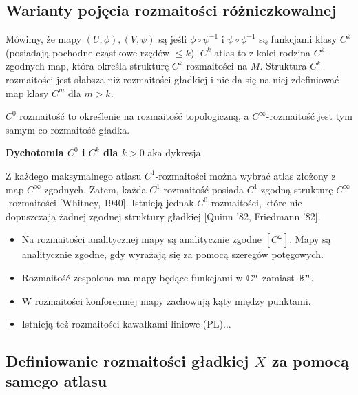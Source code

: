 \subsection{Warianty pojęcia rozmaitości różniczkowalnej}

Mówimy, że mapy $(U,\phi),(V, \psi)$ są  jeśli $\phi\circ\psi^{-1}$ i $\psi\circ\phi^{-1}$ są funkcjami klasy $C^k$ (posiadają pochodne cząstkowe rzędów $\leq k$). $C^k$-atlas to z kolei rodzina $C^k$-zgodnych map, która określa strukturę $C^k$-rozmaitości na $M$. Struktura $C^k$-rozmaitości jest słabsza niż rozmaitości gładkiej i nie da się na niej zdefiniować map klasy $C^m$ dla $m>k$.

$C^0$ rozmaitość to określenie na rozmaitość topologiczną, a $C^\infty$-rozmaitość jest tym samym co rozmaitość gładka.
\medskip

\textbf{Dychotomia $C^0$ i $C^k$ dla $k>0$} aka dykresja

Z każdego maksymalnego atlasu $C^1$-rozmaitości można wybrać atlas złożony z map $C^\infty$-zgodnych. Zatem, każda $C^1$-rozmaitość posiada $C^1$-zgodną strukturę $C^\infty$-rozmaitości [Whitney, 1940]. Istnieją jednak $C^0$-rozmaitości, które nie dopuszczają żadnej zgodnej struktury gładkiej [Quinn '82, Friedmann '82].
\medskip

\begin{itemize}[leftmargin=*]
  \item Na rozmaitości analitycznej mapy są analitycznie zgodne $[C^\omega]$. Mapy są analitycznie zgodne, gdy wyrażają się za pomocą szeregów potęgowych.
  \item Rozmaitość zespolona ma mapy będące funkcjami w $\mathbb{C}^n$ zamiast $\mathbb{R}^n$.
  \item W rozmaitości konforemnej mapy zachowują kąty między punktami.
  \item Istnieją też rozmaitości kawałkami liniowe (PL)...
\end{itemize}

\subsection{Definiowanie rozmaitości gładkiej $X$ za pomocą samego atlasu}


